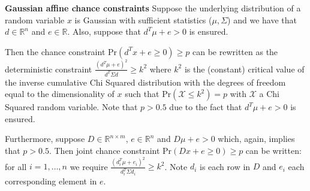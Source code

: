\begin{thrm}
\textbf{Gaussian affine chance constraints} Suppose the underlying distribution of a random variable $x$ is Gaussian with sufficient statistics ($\mu, \Sigma$) and we have that $d \in \mathbb{R}^{n}$ and $e \in \mathbb{R}$. Also, suppose that $d^T\mu+e>0$ is ensured.

Then the chance constraint $\text{Pr}(d^Tx + e \geq 0) \geq p$ can be rewritten as the deterministic constraint $\frac{(d^T\mu+e)^2}{d^T \Sigma d} \geq k^2$ where $k^2$ is the (constant) critical value of the inverse cumulative Chi Squared distribution with the degrees of freedom equal to the dimensionality of $x$ such that $\text{Pr}(\mathcal{X} \leq k^2) = p$ with $\mathcal{X}$ a Chi Squared random variable. Note that $p > 0.5$ due to the fact that $d^T\mu+e>0$ is ensured.

Furthermore, suppose $D \in \mathbb{R}^{n\times m}$, $e \in \mathbb{R}^n$ and $D\mu + e >0$ which, again, implies that $p > 0.5$. Then joint chance constraint $\text{Pr}(Dx + e \geq 0) \geq p$ can be written: for all $i=1,\hdots,n$ we require $\frac{(d^T_i\mu+e_i)^2}{d_i^T \Sigma d_i} \geq k^2$. Note $d_i$ is each row in $D$ and $e_i$ each corresponding element in $e$.
\label{thrm_chance_cons}
\end{thrm}
